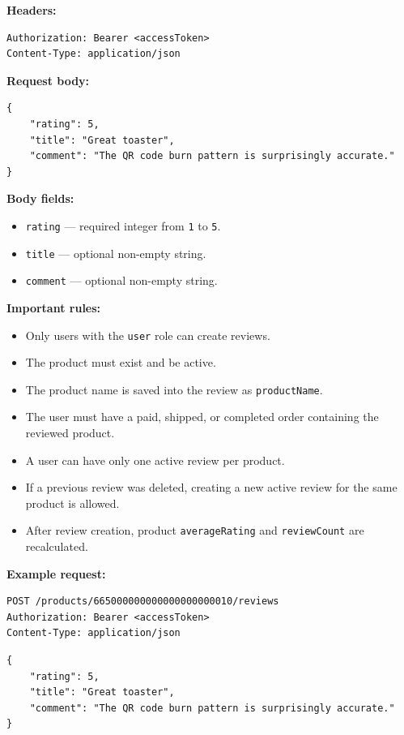 \textbf{Headers:}

\begin{verbatim}
Authorization: Bearer <accessToken>
Content-Type: application/json
\end{verbatim}

\textbf{Request body:}

\begin{verbatim}
{
    "rating": 5,
    "title": "Great toaster",
    "comment": "The QR code burn pattern is surprisingly accurate."
}
\end{verbatim}

\textbf{Body fields:}

\begin{itemize}
    \item \texttt{rating} --- required integer from \texttt{1} to \texttt{5}.
    \item \texttt{title} --- optional non-empty string.
    \item \texttt{comment} --- optional non-empty string.
\end{itemize}

\textbf{Important rules:}

\begin{itemize}
    \item Only users with the \texttt{user} role can create reviews.
    \item The product must exist and be active.
    \item The product name is saved into the review as \texttt{productName}.
    \item The user must have a paid, shipped, or completed order containing the reviewed product.
    \item A user can have only one active review per product.
    \item If a previous review was deleted, creating a new active review for the same product is allowed.
    \item After review creation, product \texttt{averageRating} and \texttt{reviewCount} are recalculated.
\end{itemize}

\textbf{Example request:}

\begin{verbatim}
POST /products/665000000000000000000010/reviews
Authorization: Bearer <accessToken>
Content-Type: application/json
\end{verbatim}

\begin{verbatim}
{
    "rating": 5,
    "title": "Great toaster",
    "comment": "The QR code burn pattern is surprisingly accurate."
}
\end{verbatim}

